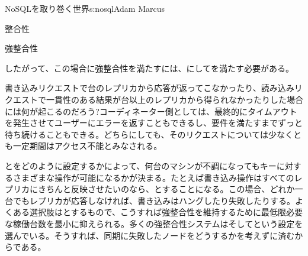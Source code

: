 \begin{aosachapter}{NoSQLを取り巻く世界}{s:nosql}{Adam Marcus}
\begin{aosasect1}{整合性}
\begin{aosasect2}{強整合性}
\begin{aosaitemize}
\end{aosaitemize}

したがって、この場合に強整合性を満たすには、にしてを満たす必要がある。

書き込みリクエストで台のレプリカから応答が返ってこなかったり、読み込みリクエストで一貫性のある結果が台以上のレプリカから得られなかったりした場合には何が起こるのだろう?コーディネーター側としては、最終的にタイムアウトを発生させてユーザーにエラーを返すこともできるし、要件を満たすまでずっと待ち続けることもできる。どちらにしても、そのリクエストについては少なくとも一定期間はアクセス不能とみなされる。

とをどのように設定するかによって、何台のマシンが不調になってもキーに対するさまざまな操作が可能になるかが決まる。たとえば書き込み操作はすべてのレプリカにきちんと反映させたいのなら、とすることになる。この場合、どれか一台でもレプリカが応答しなければ、書き込みはハングしたり失敗したりする。よくある選択肢はとするもので、こうすれば強整合性を維持するために最低限必要な稼働台数を最小に抑えられる。多くの強整合性システムはそしてという設定を選んでいる。そうすれば、同期に失敗したノードをどうするかを考えずに済むからである。


\end{aosasect2}
\end{aosasect1}
\end{aosachapter}
